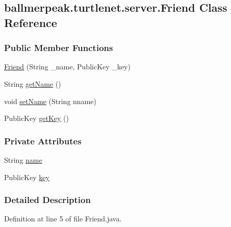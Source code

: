 \hypertarget{classballmerpeak_1_1turtlenet_1_1server_1_1Friend}{\subsection{ballmerpeak.\-turtlenet.\-server.\-Friend Class Reference}
\label{classballmerpeak_1_1turtlenet_1_1server_1_1Friend}
}
\subsubsection*{Public Member Functions}
\begin{DoxyCompactItemize}
\item 
\hyperlink{classballmerpeak_1_1turtlenet_1_1server_1_1Friend_a50e9ef8a47c46e1eea3e649e51cad734}{Friend} (String \-\_\-name, Public\-Key \-\_\-key)
\item 
String \hyperlink{classballmerpeak_1_1turtlenet_1_1server_1_1Friend_a9d1d463695e2067519e22fd72e755896}{get\-Name} ()
\item 
void \hyperlink{classballmerpeak_1_1turtlenet_1_1server_1_1Friend_af8c55f75a45736fc7d0a811eb0d16135}{set\-Name} (String nname)
\item 
Public\-Key \hyperlink{classballmerpeak_1_1turtlenet_1_1server_1_1Friend_a494b2f9df729538a993850f59a418d85}{get\-Key} ()
\end{DoxyCompactItemize}
\subsubsection*{Private Attributes}
\begin{DoxyCompactItemize}
\item 
String \hyperlink{classballmerpeak_1_1turtlenet_1_1server_1_1Friend_a6ca8fa062fdfee5cb31da6408d33fc47}{name}
\item 
Public\-Key \hyperlink{classballmerpeak_1_1turtlenet_1_1server_1_1Friend_a54977f0667cfb6c533e9e13b9684c66c}{key}
\end{DoxyCompactItemize}


\subsubsection{Detailed Description}


Definition at line 5 of file Friend.\-java.



